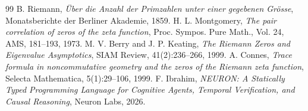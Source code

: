 \documentclass[11pt,a4paper]{article}
\begin{document}
\begin{thebibliography}{99}
 B. Riemann, \textit{\"Uber die Anzahl der Primzahlen unter einer gegebenen Gr\"osse}, Monatsberichte der Berliner Akademie, 1859.
 H. L. Montgomery, \textit{The pair correlation of zeros of the zeta function}, Proc. Sympos. Pure Math., Vol. 24, AMS, 181--193, 1973.
 M. V. Berry and J. P. Keating, \textit{The Riemann Zeros and Eigenvalue Asymptotics}, SIAM Review, 41(2):236--266, 1999.
 A. Connes, \textit{Trace formula in noncommutative geometry and the zeros of the Riemann zeta function}, Selecta Mathematica, 5(1):29--106, 1999.
 F. Ibrahim, \textit{NEURON: A Statically Typed Programming Language for Cognitive Agents, Temporal Verification, and Causal Reasoning}, Neuron Labs, 2026.
\end{thebibliography}
\end{document}
